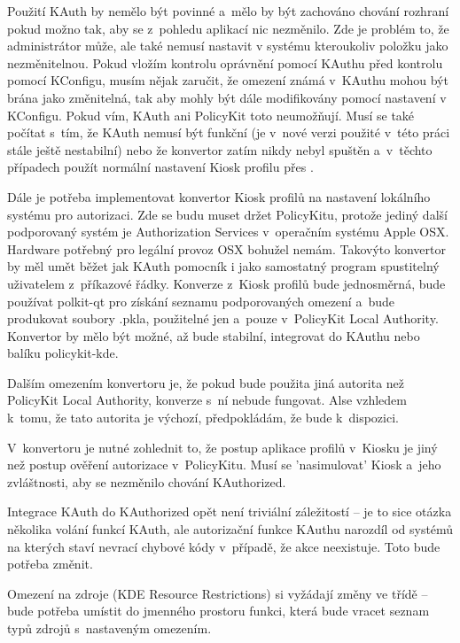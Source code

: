 {Použití KAuth by nemělo být povinné a~mělo by být zachováno chování rozhraní  pokud možno tak, aby se z~pohledu aplikací nic nezměnilo. Zde je problém to, že administrátor může, ale také nemusí nastavit v systému  kteroukoliv položku jako nezměnitelnou. Pokud vložím kontrolu oprávnění pomocí KAuthu před kontrolu pomocí KConfigu, musím nějak zaručit, že omezení známá v~KAuthu mohou být brána jako změnitelná, tak aby mohly být dále modifikovány pomocí nastavení v KConfigu. Pokud vím, KAuth ani PolicyKit toto neumožňují. Musí se také počítat s~tím, že KAuth nemusí být funkční (je v~nové verzi použité v~této práci stále ještě nestabilní) nebo že konvertor zatím nikdy nebyl spuštěn a~v~těchto případech použít normální nastavení Kiosk profilu přes .

Dále je potřeba implementovat konvertor Kiosk profilů na nastavení lokálního systému pro autorizaci. Zde se budu muset držet PolicyKitu, protože jediný další podporovaný systém je Authorization Services v~operačním systému Apple OSX. Hardware potřebný pro legální provoz OSX bohužel nemám. Takovýto konvertor by měl umět běžet jak KAuth pomocník i jako samostatný program spustitelný uživatelem z~příkazové řádky. Konverze z~Kiosk profilů bude jednosměrná, bude používat polkit-qt pro získání seznamu podporovaných omezení a~bude produkovat soubory .pkla, použitelné jen a~pouze v~PolicyKit Local Authority. Konvertor by mělo být možné, až bude stabilní, integrovat do KAuthu nebo balíku policykit-kde.

Dalším omezením konvertoru je, že pokud bude použita jiná autorita než PolicyKit Local Authority, konverze s~ní nebude fungovat. Alse vzhledem k~tomu, že tato autorita je výchozí, předpokládám, že bude k~dispozici.

V~konvertoru je nutné zohlednit to, že postup aplikace profilů v~Kiosku je jiný než postup ověření autorizace v~PolicyKitu. Musí se 'nasimulovat' Kiosk a~jeho zvláštnosti, aby se nezměnilo chování KAuthorized.

Integrace KAuth do KAuthorized opět není triviální záležitostí -- je to sice otázka několika volání funkcí KAuth, ale autorizační funkce KAuthu narozdíl od systémů na kterých staví nevrací chybové kódy v~případě, že akce neexistuje. Toto bude potřeba změnit.

Omezení na zdroje (KDE Resource Restrictions) si vyžádají změny ve třídě  -- bude potřeba umístit do jmenného prostoru  funkci, která bude vracet seznam typů zdrojů s~nastaveným omezením.

}

